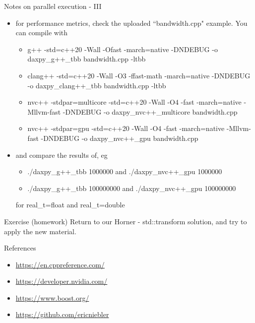 \documentclass[10pt,aspectratio=169]{beamer}
\begin{document}
\begin{frame}[fragile]{Notes on parallel execution - III}
\begin{itemize}
\item for performance metrics, check the uploaded ``bandwidth.cpp" example. You can compile with
\begin{itemize}
    \item {\ttfamily g++ -std=c++20 -Wall -Ofast -march=native -DNDEBUG -o daxpy\_g++\_tbb bandwidth.cpp -ltbb}
    \item {\ttfamily clang++ -std=c++20 -Wall -O3 -ffast-math -march=native -DNDEBUG -o daxpy\_clang++\_tbb bandwidth.cpp -ltbb}
    \item {\ttfamily nvc++ -stdpar=multicore -std=c++20 -Wall -O4 -fast -march=native -Mllvm-fast -DNDEBUG -o daxpy\_nvc++\_multicore bandwidth.cpp}
    \item {\ttfamily nvc++ -stdpar=gpu -std=c++20 -Wall -O4 -fast -march=native -Mllvm-fast -DNDEBUG -o daxpy\_nvc++\_gpu bandwidth.cpp}
\end{itemize}
\item and compare the results of, eg
\begin{itemize}
    \item {\ttfamily ./daxpy\_g++\_tbb 1000000} and {\ttfamily ./daxpy\_nvc++\_gpu 1000000}
    \item {\ttfamily ./daxpy\_g++\_tbb 100000000} and {\ttfamily ./daxpy\_nvc++\_gpu 100000000}
\end{itemize}
for {\ttfamily real\_t=float} and {\ttfamily real\_t=double}
\end{itemize}
    
\end{frame}

\begin{frame}{Exercise (homework)}
    Return to our Horner - std::transform solution, and try to apply the new material.
\end{frame}

\begin{frame}{References}
\begin{itemize}
    \item \href{https://en.cppreference.com/w/cpp/}{https://en.cppreference.com/}
    \item \href{https://developer.nvidia.com/}{https://developer.nvidia.com/}
    \item \href{https://www.boost.org/}{https://www.boost.org/}
    \item \href{https://github.com/ericniebler}{https://github.com/ericniebler}
\end{itemize}
    
\end{frame}
\end{document}
